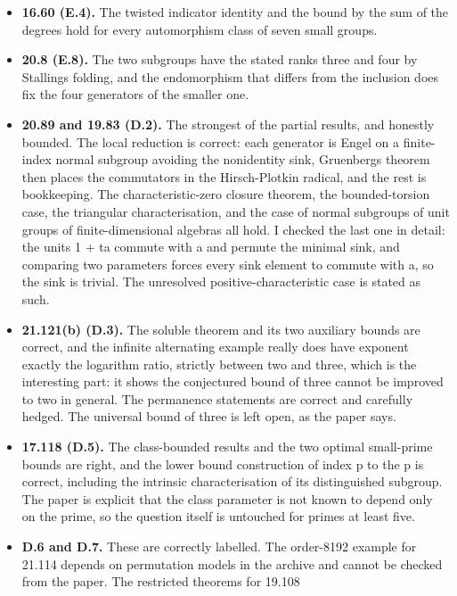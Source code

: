\begin{itemize}
  abelian group operation, and subgroups stay closed under it, on the
  Heisenberg group over the field of three elements.
\item
  \textbf{16.60 (E.4).} The twisted indicator identity and the bound by
  the sum of the degrees hold for every automorphism class of seven
  small groups.
\item
  \textbf{20.8 (E.8).} The two subgroups have the stated ranks three and
  four by Stallings folding, and the endomorphism that differs from the
  inclusion does fix the four generators of the smaller one.
\item
  \textbf{20.89 and 19.83 (D.2).} The strongest of the partial results,
  and honestly bounded. The local reduction is correct: each generator
  is Engel on a finite-index normal subgroup avoiding the nonidentity
  sink, Gruenberg\textquotesingle s theorem then places the commutators
  in the Hirsch-Plotkin radical, and the rest is bookkeeping. The
  characteristic-zero closure theorem, the bounded-torsion case, the
  triangular characterisation, and the case of normal subgroups of unit
  groups of finite-dimensional algebras all hold. I checked the last one
  in detail: the units 1 + ta commute with a and permute the minimal
  sink, and comparing two parameters forces every sink element to
  commute with a, so the sink is trivial. The unresolved
  positive-characteristic case is stated as such.
\item
  \textbf{21.121(b) (D.3).} The soluble theorem and its two auxiliary
  bounds are correct, and the infinite alternating example really does
  have exponent exactly the logarithm ratio, strictly between two and
  three, which is the interesting part: it shows the conjectured bound
  of three cannot be improved to two in general. The permanence
  statements are correct and carefully hedged. The universal bound of
  three is left open, as the paper says.
\item
  \textbf{17.118 (D.5).} The class-bounded results and the two optimal
  small-prime bounds are right, and the lower bound construction of
  index p to the p is correct, including the intrinsic characterisation
  of its distinguished subgroup. The paper is explicit that the class
  parameter is not known to depend only on the prime, so the question
  itself is untouched for primes at least five.
\item
  \textbf{D.6 and D.7.} These are correctly labelled. The order-8192
  example for 21.114 depends on permutation models in the archive and
  cannot be checked from the paper. The restricted theorems for 19.108

\end{itemize}
